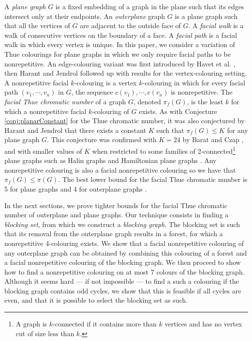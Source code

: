 \documentclass{patmorin}
\begin{document}
A \emph{plane graph} $G$ is a fixed embedding of a graph in the plane such that its edges intersect only at their endpoints. An \emph{outerplane} graph $G$ is a plane graph such that all the vertices of $G$ are adjacent to the outside face of $G$. A \emph{facial walk} is a walk of consecutive vertices on the boundary of a face. 
A \emph{facial path} is a facial walk in which every vertex is unique.
In this paper, we consider a variation of Thue colourings for plane graphs in which we only require facial paths to be nonrepetitive. An edge-colouring variant was first introduced by Havet et al. \cite{havet2011facial}, then Harant and Jendrol \cite{harant2012nonrepetitive} followed up with results for the vertex-colouring setting. A nonrepetitive facial $k$-colouring is a vertex $k$-colouring in which for every facial path $(v_1,\cdots,v_n)$ in $G$, the sequence $c(v_1),\cdots, c(v_n)$ is nonrepetitive. The \emph{facial Thue chromatic number} of a graph $G$, denoted $\pi_f(G)$, is the least $k$ for which a nonrepetitive facial $k$-colouring of $G$ exists. As with Conjecture \ref{conj:planarConstant} for the Thue chromatic number, it was also conjectured by Harant and Jendrol \cite{harant2012nonrepetitive} that there exists a constant $K$ such that $\pi_f(G) \leq K$ for any plane graph $G$. This conjecture was confirmed with $K=24$ by Barat and Czap \cite{barat2013facial}, and with smaller values of $K$ when restricted to some families of 2-connected\footnote{A graph is $k$-connected if it contains more than $k$ vertices and has no vertex cut of size less than $k$.} plane graphs such as Halin graphs and Hamiltonian plane graphs \cite{harant2012nonrepetitive}. Any nonrepetitive colouring is also a facial nonrepetitive colouring so we have that $\pi_f(G) \leq \pi(G)$. The best lower bound for the facial Thue chromatic number is 5 for plane graphs and 4 for outerplane graphs \cite{barat2013facial}.

In the next sections, we prove tighter bounds for the facial Thue chromatic number of outerplane and plane graphs. Our technique consists in finding a \emph{blocking set}, from which we construct a \emph{blocking graph}. The blocking set is such that its removal from the outerplane graph results in a forest, for which a nonrepetitive 4-colouring exists. We show that a facial nonrepetitive colouring of any outerplane graph can be obtained by combining this colouring of a forest and a facial nonrepetitive colouring of the blocking graph.
We then proceed to show how to find a nonrepetitive colouring on at most 7 colours of the blocking graph. Although it seems hard --- if not impossible --- to find a such a colouring if the blocking graph contains odd cycles, we show that this is feasible if all cycles are even, and that it is possible to select the blocking set as such.
\end{document}
